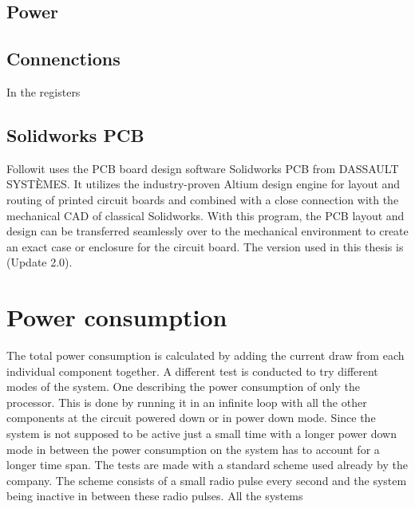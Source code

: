 \subsection{Power}


\subsection{Connenctions}
 In the registers 


\subsection{Solidworks PCB}
Followit uses the PCB board design software Solidworks PCB from DASSAULT SYSTÈMES. It utilizes the industry-proven Altium design engine for layout and routing of printed circuit boards and combined with a close connection with the mechanical CAD of classical Solidworks. With this program, the PCB layout and design can be transferred seamlessly over to the mechanical environment to create an exact case or enclosure for the circuit board. The version used in this thesis is (Update 2.0).


\section{Power consumption}
 The total power consumption is calculated by adding the current draw from each individual component together.  A different test is conducted to try different modes of the system. One describing the power consumption of only the processor. This is done by running it in an infinite loop with all the other components at the circuit powered down or in power down mode. Since the system is not supposed to be active just a small time with a longer power down mode in between the power consumption on the system has to account for a longer time span. The tests are made with a standard scheme used already by the company. The scheme consists of a small radio pulse every second and the system being inactive in between these radio pulses. 
All the systems 
